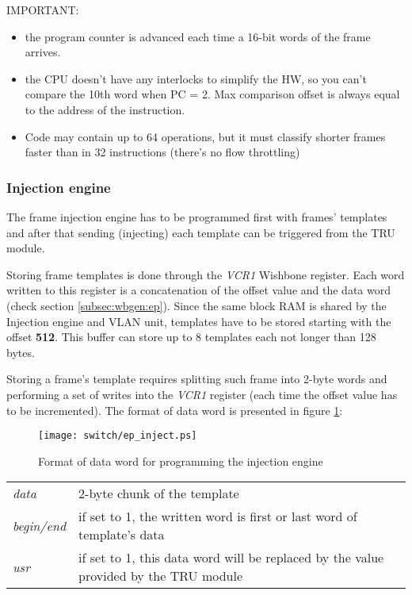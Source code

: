 IMPORTANT:
\begin{itemize}
  \item the program counter is advanced each time a 16-bit words of the frame arrives.
  \item the CPU doesn't have any interlocks to simplify the HW, so you can't
    compare the 10th word when PC = 2. Max comparison offset is always equal to
    the address of the instruction.
  \item Code may contain up to 64 operations, but it must classify shorter frames faster than in
  32 instructions (there's no flow throttling)
\end{itemize}

\subsubsection{Injection engine}
The frame injection engine has to be programmed first with frames' templates
and after that sending (injecting) each template can be triggered from the TRU
module.

Storing frame templates is done through the \emph{VCR1} Wishbone register. Each
word written to this register is a concatenation of the offset value and the data
word (check section \ref{subsec:wbgen:ep}). Since the same block RAM is shared
by the Injection engine and VLAN unit, templates have to be stored starting with
the offset {\bf 512}. This buffer can store up to 8 templates each not longer
than 128 bytes.

Storing a frame's template requires splitting such frame into 2-byte words and
performing a set of writes into the \emph{VCR1} register (each time the offset
value has to be incremented). The format of data word is presented in figure
\ref{fig:ep:inject_data}:
\begin{figure}[ht]
  \begin{center}
    \texttt{[image: switch/ep\_inject.ps]}
    \caption{Format of data word for programming the injection engine}
    \label{fig:ep:inject_data}
  \end{center}
\end{figure}

\begin{tabular}{l p{13cm}}
  \emph{data} & 2-byte chunk of the template\\
  \emph{begin/end} & if set to 1, the written word is first or last word of
    template's data\\
  \emph{usr} & if set to 1, this data word will be replaced by the value
    provided by the TRU module\\
\end{tabular}
